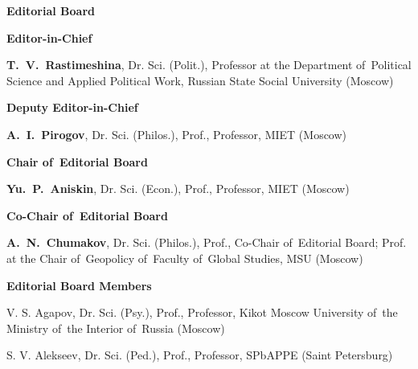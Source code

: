


\begin{otherlanguage}{english}

\vspace*{-4em}

    \begin{center}
        \textbf{Editorial Board}
    \end{center}
    
    
    
    \begin{multicols}{2}
       \begin{flushleft}
            
        \scriptsize
    
\begin{center}
        \textbf{Editor-in-Chief}
\end{center}
    
\noindent\textbf{T. V. Rastimeshina}, Dr. Sci. (Polit.), Professor at the Department of Political Science and Applied Political Work, Russian State Social University (Moscow)
    
        \begin{center}
        \textbf{Deputy Editor-in-Chief}
        \end{center}
    
\noindent  \textbf{A. I. Pirogov}, Dr. Sci. (Philos.), Prof., Professor, MIET (Moscow)

\begin{center}
    \textbf{Chair of Editorial Board}
    \end{center}

\noindent \textbf{Yu. P. Aniskin}, Dr. Sci. (Econ.), Prof., Professor, MIET (Moscow)

\begin{center}
    \textbf{Co-Chair of Editorial Board}
    \end{center}

\noindent \textbf{A. N. Chumakov}, Dr. Sci. (Philos.), Prof., Co-Chair of Editorial Board; Prof. at the Chair of Geopolicy of Faculty of Global Studies, MSU (Moscow)

\begin{center}
    \textbf{Editorial Board Members}
\end{center}

\noindent V. S. Agapov, Dr. Sci. (Psy.), Prof., Professor, Kikot Moscow University of the Ministry of the Interior of Russia (Moscow)

\noindent S. V. Alekseev, Dr. Sci. (Ped.), Prof., Professor, SPbAPPE (Saint Petersburg)


\end{flushleft}
\end{multicols}
\end{otherlanguage}
